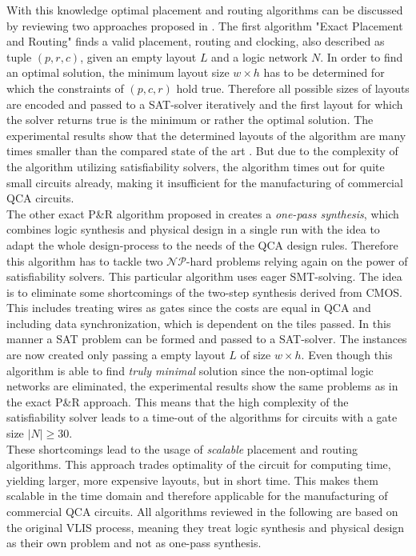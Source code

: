With this knowledge optimal placement and routing algorithms can be discussed by reviewing two approaches proposed in \cite{Walter}. The first algorithm "Exact Placement and Routing" finds a valid placement, routing and clocking, also described as tuple $(p, r, c)$, given an empty layout $L$ and a logic network $N$. In order to find an optimal solution, the minimum layout size $w \times h$ has to be determined for which the constraints of $(p, c, r)$ hold true. Therefore all possible sizes of layouts are encoded and passed to a SAT-solver iteratively and the first layout for which the solver returns true is the minimum or rather the optimal solution. The experimental results show that the determined layouts of the algorithm are many times smaller than the compared state of the art \cite{fontes, trindade2016placement}. But due to the complexity of the algorithm utilizing satisfiability solvers, the algorithm times out for quite small circuits already, making it insufficient for the manufacturing of commercial QCA circuits.\\
The other exact P\&R algorithm proposed in \cite{Walter} creates a \textit{one-pass synthesis}, which combines logic synthesis and physical design in a single run with the idea to adapt the whole design-process to the needs of the QCA design rules. Therefore this algorithm has to tackle two $\mathcal{NP}$-hard problems relying again on the power of satisfiability solvers. This particular algorithm uses eager SMT-solving. The idea is to eliminate some shortcomings of the two-step synthesis derived from CMOS. This includes treating wires as gates since the costs are equal in QCA and including data synchronization, which is dependent on the tiles passed. In this manner a SAT problem can be formed and passed to a SAT-solver. The instances are now created only passing a empty layout $L$ of size $w \times h$. Even though this algorithm is able to find \textit{truly minimal} solution since the non-optimal logic networks are eliminated, the experimental results show the same problems as in the exact P\&R approach. This means that the high complexity of the satisfiability solver leads to a time-out of the algorithms for circuits with a gate size $|N| \geq 30$.\\
These shortcomings lead to the usage of \textit{scalable} placement and routing algorithms. This approach trades optimality of the circuit for computing time, yielding larger, more expensive layouts, but in short time. This makes them scalable in the time domain and therefore applicable for the manufacturing of commercial QCA circuits. All algorithms reviewed in the following are based on the original VLIS process, meaning they treat logic synthesis and physical design as their own problem and not as one-pass synthesis.\\
